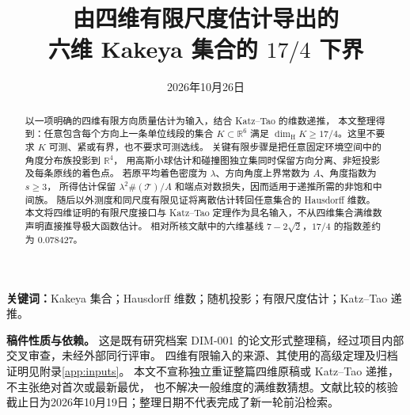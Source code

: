 \documentclass[UTF8,fontset=fandol,a4paper,11pt]{ctexart}
\title{由四维有限尺度估计导出的\texorpdfstring{\\}{ }六维 Kakeya 集合的 $17/4$ 下界}
\author{}
\date{2026年10月26日}
\numberwithin{equation}{section}
\theoremstyle{plain}
\theoremstyle{definition}
\theoremstyle{remark}
\newcommand{\R}{\mathbb R}
\newcommand{\T}{\mathcal T}
\newcommand{\HH}{\operatorname{dim}_{\mathrm H}}
\newcommand{\card}[1]{\#\!\left(#1\right)}
\begin{document}
\maketitle
\begin{abstract}
以一项明确的四维有限方向质量估计为输入，结合 Katz--Tao 的维数递推，
本文整理得到：任意包含每个方向上一条单位线段的集合 $K\subset\R^6$ 满足
$\HH K\ge17/4$。这里不要求 $K$ 可测、紧或有界，也不要求可测选线。
关键有限步骤是把任意固定环境空间中的角度分布族投影到 $\R^4$，
用高斯小球估计和碰撞图独立集同时保留方向分离、非短投影及每条原线的着色点。
若原平均着色密度为 $\lambda$、方向角度上界常数为 $A$、角度指数为 $s\ge3$，
所得估计保留 $\lambda^2\card{\T}/A$ 和端点对数损失，因而适用于递推所需的非饱和中间族。
随后以外测度和同尺度有限见证将离散估计转回任意集合的 Hausdorff 维数。
本文将四维证明的有限尺度接口与 Katz--Tao 定理作为具名输入，不从四维集合满维数声明直接推导极大函数估计。
相对所核文献中的六维基线 $7-2\sqrt2$，$17/4$ 的指数差约为 $0.078427$。
\end{abstract}
\noindent\textbf{关键词：}Kakeya 集合；Hausdorff 维数；随机投影；有限尺度估计；Katz--Tao 递推。

\medskip
\noindent\textbf{稿件性质与依赖。}
这是既有研究档案 DIM-001 的论文形式整理稿，经过项目内部交叉审查，未经外部同行评审。
四维有限输入的来源、其使用的高级定理及归档证明见附录\ref{app:inputs}。
本文不宣称独立重证整篇四维原稿或 Katz--Tao 递推，不主张绝对首次或最新最优，
也不解决一般维度的满维数猜想。文献比较的核验截止日为2026年10月19日；整理日期不代表完成了新一轮前沿检索。







\appendix


\end{document}
